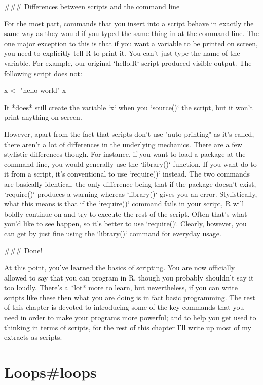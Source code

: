 ### Differences between scripts and the command line

For the most part, commands that you insert into a script behave in exactly the same way as they would if you typed the same thing in at the command line. The one major exception to this is that if you want a variable to be printed on screen, you need to explicitly tell R to print it. You can't just type the name of the variable. For example, our original `hello.R` script produced visible output. The following script does not:

\begin{script}
x <- "hello world"
x
\end{script}
It *does* still create the variable `x` when you `source()` the script, but it won't print anything on screen. 

However, apart from the fact that scripts don't use "auto-printing" as it's called, there aren't a lot of differences in the underlying mechanics. There are a few stylistic differences though. For instance, if you want to load a package at the command line, you would generally use the `library()` function. If you want do to it from a script, it's conventional to use `require()` instead. The two commands are basically identical, the only difference being that if the package doesn't exist, `require()` produces a warning whereas `library()` gives you an error. Stylistically, what this means is that if the `require()` command fails in your script, R will boldly continue on and try to execute the rest of the script. Often that's what you'd like to see happen, so it's better to use `require()`. Clearly, however, you can get by just fine using the `library()` command for everyday usage.


### Done!

At this point, you've learned the basics of scripting. You are now officially allowed to say that you can program in R, though you probably shouldn't say it too loudly. There's a *lot* more to learn, but nevertheless, if you can write scripts like these then what you are doing is in fact basic programming. The rest of this chapter is devoted to introducing some of the key commands that you need in order to make your programs more powerful; and to help you get used to thinking in terms of scripts, for the rest of this chapter I'll write up most of my extracts as scripts.


\section{Loops{#loops}}

